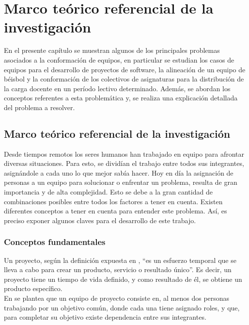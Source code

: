 \chapter{Marco teórico referencial de la investigación}\label{chap:1}

En el presente capítulo se muestran algunos de los principales problemas asociados a la conformación de equipos, en particular se estudian los casos de equipos para el desarrollo de proyectos de software, la alineación de un equipo de béisbol y la conformación de los colectivos de asignaturas para la distribución de la carga docente en un período lectivo determinado. Además, se abordan los conceptos referentes a esta problemática y, se realiza una explicación detallada del problema a resolver.

\section{Marco teórico referencial de la investigación}

Desde tiempos remotos los seres humanos han trabajado en equipo para afrontar diversas situaciones. Para esto, se dividían el trabajo entre todos sus integrantes, asignándole a cada uno lo que mejor sabía hacer. Hoy en día la asignación de personas a un equipo para solucionar o enfrentar un problema, resulta de gran importancia y de alta complejidad. Esto se debe a la gran cantidad de combinaciones posibles entre todos los factores a tener en cuenta. Existen diferentes conceptos a tener en cuenta para entender este problema. Así, es preciso exponer algunos claves para el desarrollo de este trabajo.

\subsection{Conceptos fundamentales}

Un proyecto, según la definición expuesta en \cite{Institute2020}, “es un esfuerzo temporal que se lleva a cabo para crear un producto, servicio o resultado único”. Es decir, un proyecto tiene un tiempo de vida definido, y como resultado de él, se obtiene un producto específico.\\

En \cite{63} se plantea que un equipo de proyecto consiste en, al menos dos personas trabajando por un objetivo común, donde cada una tiene asignado roles, y que, para completar su objetivo existe dependencia entre sus integrantes.\\

